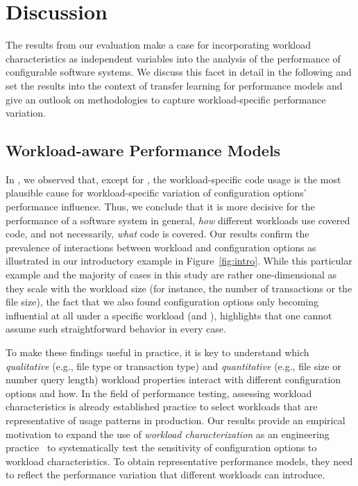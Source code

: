 {\section{Discussion}
The results from our evaluation make a case for incorporating workload characteristics as independent variables into the analysis of the performance of configurable software systems. We discuss this facet in detail in the following and set the results into the context of transfer learning for performance models and give an outlook on methodologies to capture workload-specific performance variation.

\subsection{Workload-aware Performance Models}
In , we observed that, except for \jadx, the workload-specific code usage is the most plausible cause for workload-specific variation of configuration options’ performance influence. Thus, we conclude that it is more decisive for the performance of a software system in general, \emph{how} different workloads use covered code, and not necessarily, \emph{what} code is covered. Our results confirm the prevalence of interactions between workload and configuration options as illustrated in our introductory example in Figure~\ref{fig:intro}. While this particular example and the majority of cases in this study are rather one-dimensional as they scale with the workload size (for instance, the number of transactions or the file size), the fact that we also found configuration options only becoming influential at all under a specific workload (\kanzi and \dconvert), highlights that one cannot assume such straightforward behavior in every case. 

To make these findings useful in practice, it is key to understand which \emph{qualitative} (e.g., file type or transaction type) and \emph{quantitative} (e.g., file size or number query length) workload properties interact with different configuration options and how. In the field of performance testing, assessing workload characteristics is already established practice to select workloads that are representative of usage patterns in production. Our results provide an empirical motivation to expand the use of \emph{workload characterization} as an engineering practice~\cite{calzarossa2016} to systematically test the sensitivity of configuration options to workload characteristics. To obtain representative performance models, they need to reflect the performance variation that different workloads can introduce.

}
